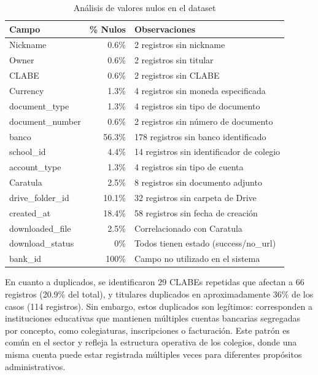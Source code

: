 \begin{table}[htbp]
\centering
\caption{Análisis de valores nulos en el dataset}
\label{tab:valores_nulos}
\begin{tabular}{|l|r|p{7cm}|}
\hline
\textbf{Campo} & \textbf{\% Nulos} & \textbf{Observaciones} \\
\hline
Nickname & 0.6\% & 2 registros sin nickname \\
\hline
Owner & 0.6\% & 2 registros sin titular \\
\hline
CLABE & 0.6\% & 2 registros sin CLABE \\
\hline
Currency & 1.3\% & 4 registros sin moneda especificada \\
\hline
document\_type & 1.3\% & 4 registros sin tipo de documento \\
\hline
document\_number & 0.6\% & 2 registros sin número de documento \\
\hline
banco & 56.3\% & 178 registros sin banco identificado \\
\hline
school\_id & 4.4\% & 14 registros sin identificador de colegio \\
\hline
account\_type & 1.3\% & 4 registros sin tipo de cuenta \\
\hline
Caratula & 2.5\% & 8 registros sin documento adjunto \\
\hline
drive\_folder\_id & 10.1\% & 32 registros sin carpeta de Drive \\
\hline
created\_at & 18.4\% & 58 registros sin fecha de creación \\
\hline
downloaded\_file & 2.5\% & Correlacionado con Caratula \\
\hline
download\_status & 0\% & Todos tienen estado (success/no\_url) \\
\hline
bank\_id & 100\% & Campo no utilizado en el sistema \\
\hline
\end{tabular}
\end{table}

En cuanto a duplicados, se identificaron 29 CLABEs repetidas que afectan a 66 registros (20.9\% del total), y titulares duplicados en aproximadamente 36\% de los casos (114 registros). Sin embargo, estos duplicados son legítimos: corresponden a instituciones educativas que mantienen múltiples cuentas bancarias segregadas por concepto, como colegiaturas, inscripciones o facturación. Este patrón es común en el sector y refleja la estructura operativa de los colegios, donde una misma cuenta puede estar registrada múltiples veces para diferentes propósitos administrativos.

